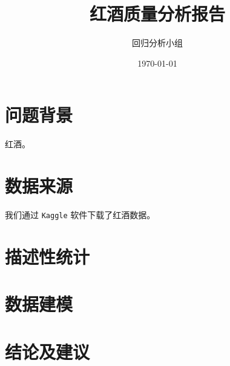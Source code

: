 \documentclass{ctexart}
\title{红酒质量分析报告}
\author{回归分析小组}
\date{\today}
\begin{document}
    \maketitle
    \thispagestyle{empty}
    \newpage

    \tableofcontents
    \thispagestyle{empty}
    \newpage
    \setcounter{page}{1} %

    \section{问题背景}
        红酒。

    \section{数据来源}
        我们通过 \texttt{Kaggle} 软件下载了红酒数据。 

    \section{描述性统计}

    \section{数据建模}

    \section{结论及建议}

    \newpage
\end{document}
